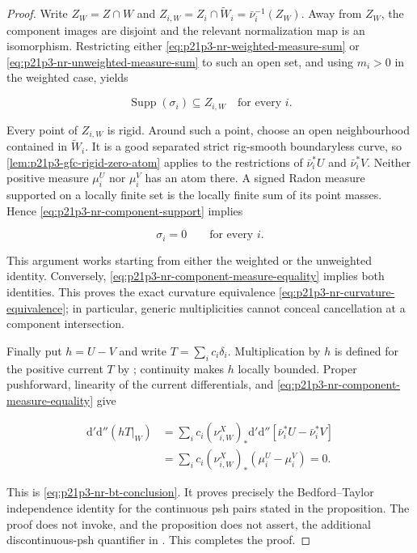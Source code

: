 \begin{proof}
Write \(Z_W=Z\cap W\) and
\(Z_{i,W}=Z_i\cap\widetilde W_i=\bar\nu_i^{-1}(Z_W)\).  Away from \(Z_W\),
the component images are disjoint and the relevant normalization map is
an isomorphism.  Restricting either
\eqref{eq:p21p3-nr-weighted-measure-sum} or
\eqref{eq:p21p3-nr-unweighted-measure-sum} to such an open set, and
using \(m_i>0\) in the weighted case, yields

\begin{equation}
\label{eq:p21p3-nr-component-support}
                       \operatorname{Supp}(\sigma_i)
                       \subseteq Z_{i,W}
                       \quad\text{for every }i.
\end{equation}

Every point of \(Z_{i,W}\) is rigid.  Around such a point, choose an open
neighbourhood contained in \(\widetilde W_i\).  It is a good separated
strict rig-smooth boundaryless curve, so
\cref{lem:p21p3-gfc-rigid-zero-atom} applies to the restrictions of
\(\bar\nu_i^*U\) and \(\bar\nu_i^*V\).  Neither positive measure
\(\mu_i^U\) nor \(\mu_i^V\) has an atom there.  A signed Radon measure
supported on a locally finite set is the locally finite sum of its point
masses.  Hence \eqref{eq:p21p3-nr-component-support} implies

\begin{equation}
\label{eq:p21p3-nr-component-measure-equality}
                         \sigma_i=0\qquad\text{for every }i.
\end{equation}

This argument works starting from either the weighted or the unweighted
identity.  Conversely,
\eqref{eq:p21p3-nr-component-measure-equality} implies both identities.
This proves the exact curvature equivalence
\eqref{eq:p21p3-nr-curvature-equivalence}; in particular, generic
multiplicities cannot conceal cancellation at a component intersection.

Finally put \(h=U-V\) and write \(T=\sum_i c_i\delta_i\).  Multiplication
by \(h\) is defined for the positive current \(T\) by
\cite[Example~7.2.12]{CLD25}; continuity makes \(h\) locally bounded.
Proper pushforward, linearity of the current differentials, and
\eqref{eq:p21p3-nr-component-measure-equality} give

\begin{align*}
 \mathrm d'\mathrm d''(hT|_W)
 &=\sum_i c_i(\nu_{i,W}^{X})_*
     \mathrm d'\mathrm d''
       [\bar\nu_i^*U-\bar\nu_i^*V]\\
 &=\sum_i c_i(\nu_{i,W}^{X})_*(\mu_i^U-\mu_i^V)=0.
\end{align*}

This is \eqref{eq:p21p3-nr-bt-conclusion}.  It proves precisely the
Bedford--Taylor independence identity for the continuous psh pairs stated
in the proposition.  The proof does not invoke, and the proposition does
not assert, the additional discontinuous-psh quantifier in
\cite[Definition~8.6.2]{CLD25}.  This completes the proof.
\end{proof}
